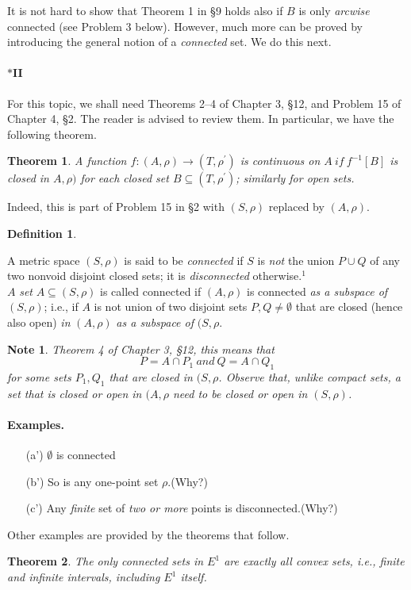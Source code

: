 \documentclass{article}
\newtheorem{defi}{Definition}
\newtheorem {thr}{Theorem}
\newtheorem{n}{Note}
\begin{document}
\par
It is not hard to show that Theorem 1 in \S9 holds also if $B$ is only \textit{arcwise} connected (see Problem 3 below). However, much more can be proved by introducing the general notion of a \textit{connected} set. We do this next. 
\paragraph{\textbf{$\ast$II}} For this topic, we shall need Theorems 2–4 of Chapter 3, \S12, and Problem 15 of Chapter 4, \S2. The reader is advised to review them. In particular, we have the following theorem.
\begin{thr}
    A function $f:(A,\rho)\rightarrow(T,\rho^{'})$ is continuous on $A \ {if} \ f^{-1} {[B]}$ is closed in $A,\rho)$ for each closed set $B \subseteq (T,\rho^{'})$; similarly for open sets.
\end{thr}
Indeed, this is part of Problem 15 in §2 with $(S,\rho)$ replaced by $(A,\rho)$.
\begin{defi}
\end{defi}
    A metric space $(S,\rho)$ is said to be \textit{connected} if $S$ is \textit{not}
    the union $P \cup Q$ of any two nonvoid disjoint closed sets; it is \textit{disconnected} otherwise.$^1$\\
    $A$ \textit{set} $A \subseteq (S,\rho)$ is called connected if $(A,\rho)$ is connected \textit{as a subspace of} $(S,\rho)$; i.e., if $A$ is not union of two disjoint sets $P,Q\ne \emptyset$  that are
    closed (hence also open) \textit{in} $(A,\rho)$ \textit{as a subspace of} $(S,\rho$.
    \begin{n}
    \textnormal{Theorem 4 of Chapter 3, \S12, this means that $$P = A \cap P_{1} \ and \ Q =  A\cap Q_{1}$$ for some sets $P_{1}, Q_{1}$ that are closed \textit{in} $(S,\rho$. Observe that, unlike compact
sets, a set that is closed or open in $(A,\rho$ need to be closed or open in $(S,\rho)$.}
    \end{n}
\paragraph{\textbf{Examples.}}
\begin{enumerate}
    \item [(a')] $\emptyset$ is connected
    \item [(b')] So is any one-point set ${\rho}$.(Why?)
    \item [(c')] Any \textit{finite} set of \textit{two or more} points is disconnected.(Why?)\\
\end{enumerate}
    Other examples are provided by the theorems that follow.
\begin{thr}
    The only connected sets in $E^1$ are exactly all convex sets, i.e., finite and infinite intervals, including $E^1$ itself.
\end{thr}
\end{document}
